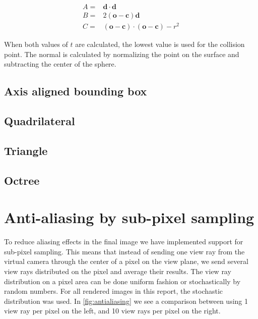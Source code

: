 \documentclass[]{report}   %
\begin{document}
\begin{subequations} \label{eq:sparsub}
\begin{align}
A =& \mathbf{d} \cdot \mathbf{d} \\
B =& 2(\mathbf{o} - \mathbf{c}) \mathbf{d} \\
C =& (\mathbf{o} - \mathbf{c}) \cdot (\mathbf{o} - \mathbf{c}) - r^2
\end{align}
\end{subequations}

When both values of $t$ are calculated, the lowest value is used for the collision point. The normal is calculated by normalizing the point on the surface and subtracting the center of the sphere.

\subsection{Axis aligned bounding box}


\subsection{Quadrilateral}
\subsection{Triangle}
\subsection{Octree}

\section{Anti-aliasing by sub-pixel sampling}
To reduce aliasing effects in the final image we have implemented support for sub-pixel sampling.
This means that instead of sending one view ray from the virtual camera through the center of a pixel on the view plane, we send several view rays distributed on the pixel and average their results.
The view ray distribution on a pixel area can be done uniform fashion or stochastically by random numbers.
For all rendered images in this report, the stochastic distribution was used.
In  \autoref{fig:antialiasing} we see a comparison between using 1 view ray per pixel on the left, and 10 view rays per pixel on the right.
\end{document}

